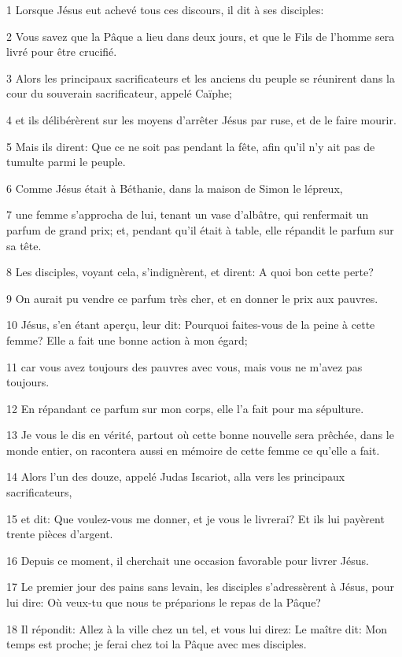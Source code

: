 \par 1 Lorsque Jésus eut achevé tous ces discours, il dit à ses disciples:
\par 2 Vous savez que la Pâque a lieu dans deux jours, et que le Fils de l'homme sera livré pour être crucifié.
\par 3 Alors les principaux sacrificateurs et les anciens du peuple se réunirent dans la cour du souverain sacrificateur, appelé Caïphe;
\par 4 et ils délibérèrent sur les moyens d'arrêter Jésus par ruse, et de le faire mourir.
\par 5 Mais ils dirent: Que ce ne soit pas pendant la fête, afin qu'il n'y ait pas de tumulte parmi le peuple.
\par 6 Comme Jésus était à Béthanie, dans la maison de Simon le lépreux,
\par 7 une femme s'approcha de lui, tenant un vase d'albâtre, qui renfermait un parfum de grand prix; et, pendant qu'il était à table, elle répandit le parfum sur sa tête.
\par 8 Les disciples, voyant cela, s'indignèrent, et dirent: A quoi bon cette perte?
\par 9 On aurait pu vendre ce parfum très cher, et en donner le prix aux pauvres.
\par 10 Jésus, s'en étant aperçu, leur dit: Pourquoi faites-vous de la peine à cette femme? Elle a fait une bonne action à mon égard;
\par 11 car vous avez toujours des pauvres avec vous, mais vous ne m'avez pas toujours.
\par 12 En répandant ce parfum sur mon corps, elle l'a fait pour ma sépulture.
\par 13 Je vous le dis en vérité, partout où cette bonne nouvelle sera prêchée, dans le monde entier, on racontera aussi en mémoire de cette femme ce qu'elle a fait.
\par 14 Alors l'un des douze, appelé Judas Iscariot, alla vers les principaux sacrificateurs,
\par 15 et dit: Que voulez-vous me donner, et je vous le livrerai? Et ils lui payèrent trente pièces d'argent.
\par 16 Depuis ce moment, il cherchait une occasion favorable pour livrer Jésus.
\par 17 Le premier jour des pains sans levain, les disciples s'adressèrent à Jésus, pour lui dire: Où veux-tu que nous te préparions le repas de la Pâque?
\par 18 Il répondit: Allez à la ville chez un tel, et vous lui direz: Le maître dit: Mon temps est proche; je ferai chez toi la Pâque avec mes disciples.
